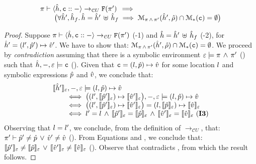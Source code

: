 \begin{lemma}\label{ca:unification:failure} 
$$
\begin{array}{l}
\cellunificationx{\sheap, \cell \lstcons -}{\uno{\pc'}}{\pc} \, \implies \, \\ 
	\qquad  \big(\forall \sheap', \sheap_f . \, \sheap = \sheap' \dunion \sheap_f \implies 
                \smodels{\sheap', \sstore}{\pc \, \wedge \, \pc'} \cap \sepmodels{\cell} = \emptyset \big)
\end{array}
$$
 \end{lemma}
 \begin{proof}
Suppose $\cellunificationx{\sheap, \cell \lstcons -}{\uno{\pc'}}{\pc}$ (\hyp{1}) and 
$\sheap = \sheap' \dunion \sheap_f$ (\hyp{2}), for $\sheap' = (\loc', \sexprp') \mapsto \sexprv'$. 
We have to show that: $\smodels{\sheap', \sstore}{\pc \, \wedge \, \pc'} \cap \sepmodels{\cell} = \emptyset$.
We proceed by \emph{contradiction} assuming that there is a symbolic environment 
$\senv \satisfies \pc \, \wedge \, \pc'$ () such that $\sheap, -, \senv \satisfies \cell$ (). 
Given that $\cell = (\loc, \sexprp) \mapsto \sexprv$ for some location $\loc$ and 
symbolic expressions $\sexprp$ and $\sexprv$, we conclude that: 
$$
\begin{array}{l}
\symbeval{\sheap'}{\senv}, -, \senv \satisfies (\loc, \sexprp) \mapsto \sexprv \\ 
\qquad \iff \big((\loc', \symbeval{\sexprp'}{\senv}) \mapsto \symbeval{\sexprv'}{\senv} \big), -, \senv \satisfies (\loc, \sexprp) \mapsto \sexprv \\ 
\qquad \iff \big((\loc', \symbeval{\sexprp'}{\senv}) \mapsto \symbeval{\sexprv'}{\senv} \big) = (\loc, \symbeval{\sexprp}{\senv}) \mapsto \symbeval{\sexprv}{\senv} \\
\qquad \iff \loc' = \loc \, \wedge \, \symbeval{\sexprp'}{\senv} = \symbeval{\sexprp}{\senv} \, \wedge \, \symbeval{\sexprv'}{\senv} = \symbeval{\sexprv}{\senv} \text{ (\ieq{3})}
\end{array}
$$
Observing that $\loc = \loc'$, we conclude, from the definition of $\rightarrow_{\mathcal CU}$, that: 
$\pc' \vdash \sexprp' \neq \sexprp \, \vee \, \sexprv' \neq \sexprv$ (). 
From Equations  and , we conclude that: 
$\symbeval{\sexprp'}{\senv} \neq \symbeval{\sexprp}{\senv} \, \vee \, \symbeval{\sexprv'}{\senv} \neq \symbeval{\sexprv}{\senv}$ (). 
Observe that  contradicts , from which the result follows.
\end{proof}
 
